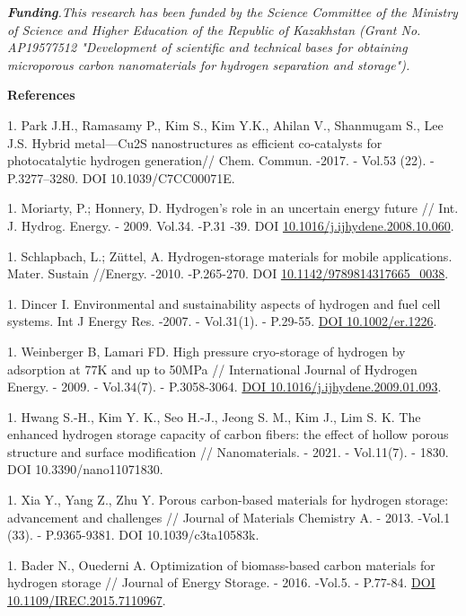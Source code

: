\begin{multicols}{2}
\emph{{\bfseries Funding}.This research has been funded by the Science
Committee of the Ministry of Science and Higher Education of the
Republic of Kazakhstan (Grant No. AP19577512 "Development of scientific
and technical bases for obtaining microporous carbon nanomaterials for
hydrogen separation and storage").}
\end{multicols}

\begin{center}
{\bfseries References}
\end{center}

\begin{references}
1. Park J.H., Ramasamy P., Kim S., Kim Y.K., Ahilan V., Shanmugam S., Lee
J.S. Hybrid metal---Cu2S nanostructures as efficient co-catalysts for
photocatalytic hydrogen generation// Chem. Commun. -2017. - Vol.53
(22). - P.3277--3280. DOI 10.1039/C7CC00071E.

1. Moriarty, P.; Honnery, D. Hydrogen's role in an uncertain energy
future // Int. J. Hydrog. Energy. - 2009. Vol.34. -P.31 -39. DOI
\href{http://dx.doi.org/10.1016/j.ijhydene.2008.10.060}{10.1016/j.ijhydene.2008.10.060}.

1. Schlapbach, L.; Züttel, A. Hydrogen-storage materials for mobile
applications. Mater. Sustain //Energy. -2010. -P.265-270. DOI
\href{http://dx.doi.org/10.1142/9789814317665_0038}{10.1142/9789814317665\_0038}.

1. Dincer I. Environmental and sustainability aspects of hydrogen and
fuel cell systems. Int J Energy Res. -2007. - Vol.31(1). - P.29-55.
\href{https://doi.org/10.1002/er.1226}{DOI 10.1002/er.1226}.

1. Weinberger B, Lamari FD. High pressure cryo-storage of hydrogen by
adsorption at 77K and up to 50MPa // International Journal of Hydrogen
Energy. - 2009. - Vol.34(7). - P.3058-3064.
\href{https://doi.org/10.1016/j.ijhydene.2009.01.093}{DOI
10.1016/j.ijhydene.2009.01.093}.

1. Hwang S.-H., Kim Y. K., Seo H.-J., Jeong S. M., Kim J., Lim S. K. The
enhanced hydrogen storage capacity of carbon fibers: the effect of
hollow porous structure and surface modification // Nanomaterials. -
2021. - Vol.11(7). - 1830. DOI 10.3390/nano11071830.

1. Xia Y., Yang Z., Zhu Y. Porous carbon-based materials for hydrogen
storage: advancement and challenges // Journal of Materials Chemistry
A. - 2013. -Vol.1 (33). - P.9365-9381. DOI 10.1039/c3ta10583k.

1. Bader N., Ouederni A. Optimization of biomass-based carbon materials
for hydrogen storage // Journal of Energy Storage. - 2016. -Vol.5. -
P.77-84. \href{https://doi.org/10.1016/j.est.2015.12.009}{DOI
\href{http://dx.doi.org/10.1109/IREC.2015.7110967}{10.1109/IREC.2015.7110967}}.


\end{references}

